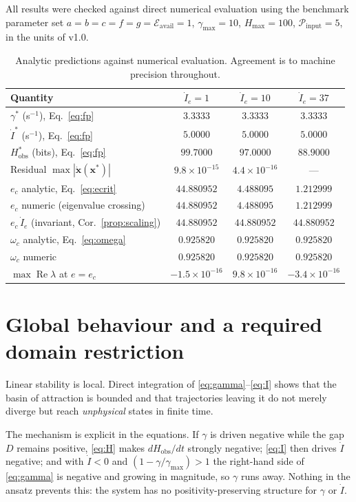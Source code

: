 \documentclass[11pt,a4paper]{article}
\theoremstyle{definition}
\begin{document}
All results were checked against direct numerical evaluation using the
benchmark parameter set
$a=b=c=f=g=\mathcal{E}_{\text{avail}}=1$,
$\gamma_{\max}=10$, $H_{\max}=100$, $\mathcal{P}_{\text{input}}=5$,
in the units of v1.0.

\begin{table}[h]
\centering
\begin{tabularx}{\textwidth}{Xccc}
\toprule
\textbf{Quantity} & $\dot I_e=1$ & $\dot I_e=10$ & $\dot I_e=37$\\
\midrule
$\gamma^{*}$ (s$^{-1}$), Eq.~\eqref{eq:fp} & $3.3333$ & $3.3333$ & $3.3333$\\
$\dot I^{*}$ (s$^{-1}$), Eq.~\eqref{eq:fp} & $5.0000$ & $5.0000$ & $5.0000$\\
$H^{*}_{\text{obs}}$ (bits), Eq.~\eqref{eq:fp} & $99.7000$ & $97.0000$ & $88.9000$\\
Residual $\max|\dot{\mathbf{x}}(\mathbf{x}^{*})|$ & $9.8\times10^{-15}$ & $4.4\times10^{-16}$ & ---\\
$e_c$ analytic, Eq.~\eqref{eq:ecrit} & $44.880952$ & $4.488095$ & $1.212999$\\
$e_c$ numeric (eigenvalue crossing) & $44.880952$ & $4.488095$ & $1.212999$\\
$e_c\,\dot I_e$ (invariant, Cor.~\ref{prop:scaling}) & $44.880952$ & $44.880952$ & $44.880952$\\
$\omega_c$ analytic, Eq.~\eqref{eq:omega} & $0.925820$ & $0.925820$ & $0.925820$\\
$\omega_c$ numeric & $0.925820$ & $0.925820$ & $0.925820$\\
$\max\operatorname{Re}\lambda$ at $e=e_c$ & $-1.5\times10^{-16}$ & $9.8\times10^{-16}$ & $-3.4\times10^{-16}$\\
\bottomrule
\end{tabularx}
\caption{Analytic predictions against numerical evaluation. Agreement is to
machine precision throughout.}
\end{table}

\section{Global behaviour and a required domain restriction}

Linear stability is local. Direct integration of
\eqref{eq:gamma}--\eqref{eq:I} shows that the basin of attraction is bounded
and that trajectories leaving it do not merely diverge but reach
\emph{unphysical} states in finite time.

The mechanism is explicit in the equations. If $\gamma$ is driven negative
while the gap $D$ remains positive, \eqref{eq:H} makes $dH_{\text{obs}}/dt$
strongly negative; \eqref{eq:I} then drives $\dot I$ negative; and with
$\dot I<0$ and $(1-\gamma/\gamma_{\max})>1$ the right-hand side of
\eqref{eq:gamma} is negative and growing in magnitude, so $\gamma$ runs away.
Nothing in the ansatz prevents this: the system has no positivity-preserving
structure for $\gamma$ or $\dot I$.
\end{document}
